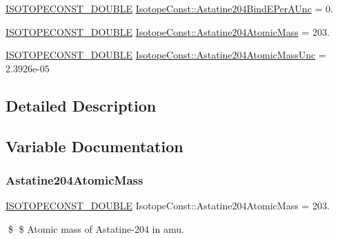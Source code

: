 \begin{DoxyCompactItemize}
\mbox{\hyperlink{group___isotope_const-_macros_ga8f45a7272ce02c0b4c65c44636ed719a}{I\+S\+O\+T\+O\+P\+E\+C\+O\+N\+S\+T\+\_\+\+D\+O\+U\+B\+LE}} \mbox{\hyperlink{group___isotope_const-_astatine-_at204_ga6f5a30f20af9b787fd4949875bf491b0}{Isotope\+Const\+::\+Astatine204\+Bind\+E\+Per\+A\+Unc}} = 0.
\item 
\mbox{\hyperlink{group___isotope_const-_macros_ga8f45a7272ce02c0b4c65c44636ed719a}{I\+S\+O\+T\+O\+P\+E\+C\+O\+N\+S\+T\+\_\+\+D\+O\+U\+B\+LE}} \mbox{\hyperlink{group___isotope_const-_astatine-_at204_ga48fc3129510b58f98cf8b44ed5a3efed}{Isotope\+Const\+::\+Astatine204\+Atomic\+Mass}} = 203.
\item 
\mbox{\hyperlink{group___isotope_const-_macros_ga8f45a7272ce02c0b4c65c44636ed719a}{I\+S\+O\+T\+O\+P\+E\+C\+O\+N\+S\+T\+\_\+\+D\+O\+U\+B\+LE}} \mbox{\hyperlink{group___isotope_const-_astatine-_at204_ga12172e84746aa0a3f253505107937bfc}{Isotope\+Const\+::\+Astatine204\+Atomic\+Mass\+Unc}} = 2.\+3926e-\/05
\end{DoxyCompactItemize}


\subsection{Detailed Description}


\subsection{Variable Documentation}
\mbox{\label{group___isotope_const-_astatine-_at204_ga48fc3129510b58f98cf8b44ed5a3efed}} 
\subsubsection{\texorpdfstring{Astatine204\+Atomic\+Mass}{Astatine204AtomicMass}}
{\footnotesize\ttfamily \mbox{\hyperlink{group___isotope_const-_macros_ga8f45a7272ce02c0b4c65c44636ed719a}{I\+S\+O\+T\+O\+P\+E\+C\+O\+N\+S\+T\+\_\+\+D\+O\+U\+B\+LE}} Isotope\+Const\+::\+Astatine204\+Atomic\+Mass = 203.}

\$ \$ Atomic mass of Astatine-\/204 in amu. \mbox{\label{group___isotope_const-_astatine-_at204_ga12172e84746aa0a3f253505107937bfc}} 
